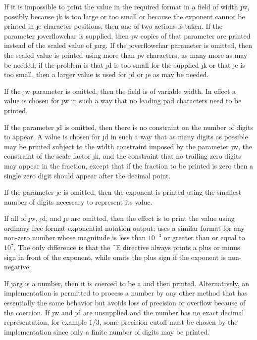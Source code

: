 If it is impossible to print the value in the required format in a field
of width \j{w}, possibly because \j{k} is too large or too small
or because the exponent cannot be printed in \j{e} character positions,
then one of two actions is taken.  If the
parameter \j{overflowchar} is supplied, then \j{w} copies of that
parameter are printed instead of the scaled value of \j{arg}.
If the \j{overflowchar} parameter is omitted, then the scaled value
is printed using more than \j{w} characters, as many more as may be
needed; if the problem is that \j{d} is too small for the supplied \j{k}
or that \j{e} is too small, then a larger value is used for \j{d} or \j{e}
as may be needed.

If the \j{w} parameter is omitted, then the field is of variable width.
In effect a value is chosen
for \j{w} in such a way that no leading pad characters need to be printed.

If the parameter \j{d} is omitted, then there is no constraint
on the number of digits to appear.
A value is chosen for \j{d} in such a way that as many digits
as possible may be printed subject to the width constraint
imposed by the parameter \j{w}, the constraint of the scale factor \j{k},
and the constraint that no trailing
zero digits may appear in the fraction, except that if the
fraction to be printed is zero then a single zero digit should
appear after the decimal point.

If the parameter \j{e} is omitted, then the exponent is printed
using the smallest number of digits necessary to represent its value.

If all of \j{w}, \j{d}, and \j{e} are omitted, then the effect is to print
the value using ordinary free-format exponential-notation output;
 uses 
a similar
format for any non-zero number whose magnitude
is less than $10^{-3}$ or greater than or equal to $10^7$.
The only difference is that the \f{~E} 
directive always prints a plus or minus sign in front of the
    exponent, while  omits the plus sign if the exponent is
    non-negative.

If \j{arg} is a  
number, then it is coerced to be a 
and then printed.  Alternatively, an implementation is permitted to
process a  
number by any other method that has essentially the
same behavior but avoids loss of precision or overflow
because of the coercion.  If \j{w} and \j{d} are
unsupplied and the number has no exact decimal representation,
for example \f{1/3}, some precision cutoff must be chosen
by the implementation since only a finite number of digits may be printed.

